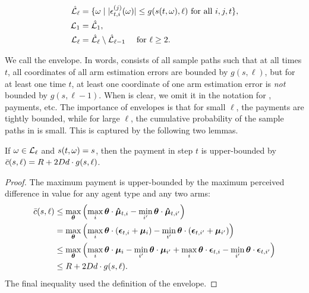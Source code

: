 \begin{align*}
\hat{\mathcal{L}}_\ell
  & = \{ \omega \mid |\epsilon_{t,i}^{(j)}(\omega)| \leq g(s(t,\omega),\ell)
    \mbox{ for all } i,j,t \},\\
{\mathcal L}_{1} & = \hat{\mathcal{L}}_1,\\ 
{\mathcal L}_{\ell} & = \hat{\mathcal{L}}_{\ell} \setminus \hat{\mathcal{L}}_{\ell-1}
  \quad \mbox{ for } \ell \geq 2.
\end{align*}

We call \Env{\ell} the \Kth{\ell} envelope.
In words, \Env{\ell} consists of all sample paths such that at all times
$t$, all coordinates of all arm estimation errors are bounded by
$g(s, \ell)$,
but for at least one time $t$, at least one coordinate of one arm
estimation error is \emph{not} bounded by $g(s, \ell-1)$.
When \SP is clear, we omit it in the notation for
, payments, etc.
The importance of envelopes is that for small $\ell$, the payments are
tightly bounded, while for large $\ell$, the cumulative probability of
the sample paths in \Env{\ell} is small.
This is captured by the following two lemmas.

\begin{lemma} \label{lem:sample-path-payment}
If $\omega \in {\mathcal L}_{\ell}$ and $s(t,\omega) = s$, then
the payment in step $t$ is upper-bounded by
$\bar{c} (s,\ell) = R + 2 D d \cdot g(s,\ell)$.
\end{lemma}

\begin{proof}
The maximum payment is upper-bounded by the maximum perceived
difference in value for any agent type and any two arms:
\begin{align*}
\bar{c} (s, \ell) & \leq 
\max_{\bm{\theta}} \left(  \max_{i} \bm{\theta} \cdot \bm{\hat{\mu}}_{t,i}
                 - \min_{i'} \bm{\theta} \cdot \bm{\hat{\mu}}_{t,i'} \right) \\
& = \max_{\bm{\theta}} \left( \max_{i}\bm{\theta} \cdot (\bm{\epsilon}_{t,i}+\bm{\mu}_{i})
                    - \min_{i'}\bm{\theta} \cdot (\bm{\epsilon}_{t,i'}+\bm{\mu}_{i'}) \right) \\
& \leq \max_{\bm{\theta}} \left(  \max_{i} \bm{\theta} \cdot \bm{\mu}_{i}
                        - \min_{i'} \bm{\theta} \cdot \bm{\mu}_{i'}
                        + \max_{i} \bm{\theta} \cdot \bm{\epsilon}_{t,i}
                        - \min_{i'} \bm{\theta} \cdot \bm{\epsilon}_{t,i'} \right) \\
& \leq R + 2 D d \cdot g(s,\ell). 
\end{align*}
The final inequality used the definition of the envelope.
\end{proof}

